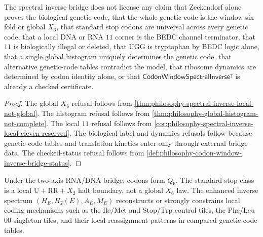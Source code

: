 \begin{theorem}
\label{thm:philosophy-inverse-spectrum-cannot-claim-boundary}
The spectral inverse bridge does not license any claim that Zeckendorf
alone proves the biological genetic code, that the whole genetic code is
the window-six fold or global $X_{6}$, that standard stop codons are
universal across every genetic code, that a local DNA or RNA $11$ corner
is the BEDC channel terminator, that $11$ is biologically illegal or
deleted, that $\mathrm{UGG}$ is tryptophan by BEDC logic alone, that a
single global histogram uniquely determines the genetic code, that
alternative genetic-code tables contradict the model, that ribosome
dynamics are determined by codon identity alone, or that
$\mathsf{CodonWindowSpectralInverse}^{\uparrow}$ is already a checked
certificate.
\end{theorem}
\begin{proof}
The global $X_{6}$ refusal follows from
\autoref{thm:philosophy-spectral-inverse-local-not-global}. The histogram
refusal follows from \autoref{thm:philosophy-global-histogram-not-complete}.
The local $11$ refusal follows from
\autoref{cor:philosophy-spectral-inverse-local-eleven-reserved}. The
biological-label and dynamics refusals follow because genetic-code tables
and translation kinetics enter only through external bridge data. The
checked-status refusal follows from
\autoref{def:philosophy-codon-window-inverse-bridge-status}.
\end{proof}

\begin{corollary}
\label{cor:philosophy-inverse-spectrum-allowed-claim}
Under the two-axis RNA/DNA bridge, codons form $Q_{6}$. The standard stop
class is a local $\mathrm{U}+\mathrm{RR}+X_{2}$ halt boundary, not a
global $X_{6}$ law. The enhanced inverse spectrum
$(H_{E},H_{2}(E),A_{E},M_{E})$ reconstructs or strongly constrains local
coding mechanisms such as the $\mathrm{Ile}/\mathrm{Met}$ and
$\mathrm{Stop}/\mathrm{Trp}$ control tiles, the Phe/Leu
$00$-singleton tiles, and their local reassignment patterns in compared
genetic-code tables.
\end{corollary}

